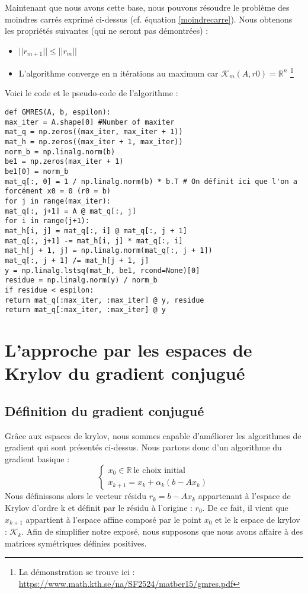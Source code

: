 Maintenant que nous avons cette base, nous pouvons résoudre le problème des moindres carrés exprimé ci-dessus (cf. équation \ref{moindrecarre}). Nous obtenons les propriétés suivantes (qui ne seront pas démontrées)  : 
\begin{itemize}
	\item $||r_{m+1}|| \leq ||r_m||$
	\item L'algorithme converge en n itérations au maximum car $\mathcal{K}_m(A, r0) = \mathbb{R}^n$ \footnote{La démonstration se trouve ici : \url{https://www.math.kth.se/na/SF2524/matber15/gmres.pdf}}
\end{itemize}
Voici le code et le pseudo-code de l'algorithme : 
\begin{verbatim}
def GMRES(A, b, espilon):
max_iter = A.shape[0] #Number of maxiter
mat_q = np.zeros((max_iter, max_iter + 1))
mat_h = np.zeros((max_iter + 1, max_iter))
norm_b = np.linalg.norm(b)
be1 = np.zeros(max_iter + 1)
be1[0] = norm_b
mat_q[:, 0] = 1 / np.linalg.norm(b) * b.T # On définit ici que l'on a forcément x0 = 0 (r0 = b)
for j in range(max_iter):
mat_q[:, j+1] = A @ mat_q[:, j]
for i in range(j+1):
mat_h[i, j] = mat_q[:, i] @ mat_q[:, j + 1]
mat_q[:, j+1] -= mat_h[i, j] * mat_q[:, i]
mat_h[j + 1, j] = np.linalg.norm(mat_q[:, j + 1])
mat_q[:, j + 1] /= mat_h[j + 1, j]
y = np.linalg.lstsq(mat_h, be1, rcond=None)[0]
residue = np.linalg.norm(y) / norm_b
if residue < espilon:
return mat_q[:max_iter, :max_iter] @ y, residue
return mat_q[:max_iter, :max_iter] @ y
\end{verbatim}

\section{L'approche par les espaces de Krylov du gradient conjugué}
\subsection{Définition du gradient conjugué}
Grâce aux espaces de krylov, nous sommes capable d'améliorer les algorithmes de gradient qui sont présentés ci-dessus. Nous partons donc d'un algorithme du gradient basique : 
\begin{equation}
\begin{cases}
	x_0 \in \mathbb{R} \ \text{le choix initial}\\
	x_{k+1} = x_k + \alpha_k (b - Ax_k)
\end{cases}
\end{equation}
Nous définissons alors le vecteur résidu $r_k = b - Ax_k$ appartenant à l'espace de Krylov d'ordre k et définit par le résidu à l'origine : $r_0$. De ce fait, il vient que $x_{k+1}$ appartient à l'espace affine composé par le point $x_0$ et le k espace de krylov : $\mathcal{K}_k$. Afin de simplifier notre exposé, nous supposons que nous avons affaire à des matrices symétriques définies positives. \\

